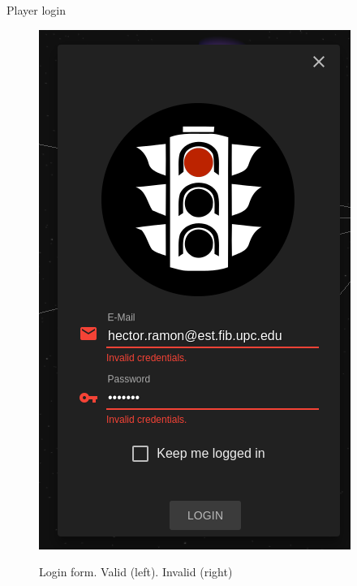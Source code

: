 \documentclass{beamer}
\begin{document}
\begin{frame}{Player login}
\begin{figure}[H]
{{\includegraphics{images/login_error.png}
}
}
\caption{Login form. Valid (left). Invalid (right)}
\label{login_form}
\end{figure}
\end{frame}
\end{document}
